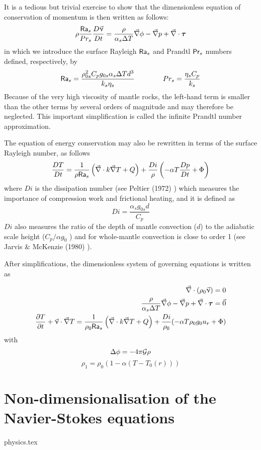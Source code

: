 It is a tedious but trivial exercise to show that the dimensionless equation of 
conservation of momentum is then written as follows:
\[
\rho \frac{{\mathsf{Ra}}_s}{Pr_s} \frac{D\vec\upnu}{Dt} =
\frac{\rho}{\alpha_s \Delta T} \vec\nabla \phi - \vec\nabla p + \vec\nabla \cdot {\bm \tau}
\]
in which we introduce the surface Rayleigh ${\mathsf{Ra}}_s$ and Prandtl ${\mathsf{Pr}}_s$ numbers defined, 
respectively, by
\[
{\mathsf{Ra}}_s=\frac{\rho_{0s}^2 C_p g_{0s} \alpha_s \Delta T d^3}{k_s \eta_s}
\qquad
\qquad
Pr_s= \frac{\eta_s C_p}{k_s}
\]
Because of the very high viscosity of mantle rocks, the left-hand term 
is smaller than the other terms by several orders of magnitude
and may therefore be neglected. This important simplification is called the 
infinite Prandtl number approximation. 

The equation of energy conservation may also be rewritten in terms of the surface Rayleigh number, as follows
\[
\frac{D T}{D t} = \frac{1}{\rho {\mathsf{Ra}}_s} \left( \vec\nabla\cdot k\vec\nabla T + Q \right) 
+\frac{Di}{\rho} \left( -\alpha T \frac{Dp}{Dt} + \Phi  \right)
\]
where $Di$ is the dissipation number (see Peltier (1972) \cite{pelt72}) 
which measures the importance of compression work and frictional heating, and it is defined
as 
\[
Di=\frac{\alpha_s g_{0s} d}{C_p}
\]
$Di$ also measures the ratio of the depth of mantle convection ($d$) to 
the adiabatic scale height ($C_p/\alpha g_0$ ) and for whole-mantle convection is
close to order 1 (see Jarvis \& McKenzie (1980) \cite{jamc80}).

After simplifications, the dimensionless system of governing equations is written as

\begin{eqnarray}
\vec\nabla\cdot(\rho_0 \vec\upnu) =0 \\
\frac{\rho}{\alpha_s \Delta T} \vec\nabla \phi - \vec\nabla p + \vec\nabla \cdot {\bm \tau} = \vec{0} \\
\frac{\partial T}{\partial t} + \vec\upnu\cdot\vec\nabla T =  
\frac{1}{\rho_0 {\mathsf{Ra}}_s} \left( \vec\nabla\cdot k\vec\nabla T + Q \right) +
\frac{Di}{\rho_0} (-\alpha T \rho_0 g_0 u_r + \Phi) 
\end{eqnarray}
with 
\[
\Delta \phi = -4\pi {\cal G} \rho
\]
\[
\rho_1=\rho_0(1-\alpha(T-T_0(r)))
\]

\section{Non-dimensionalisation of the Navier-Stokes equations}\label{ss:nondim}
\begin{flushright} {\tiny {\color{gray} physics.tex}} \end{flushright}

